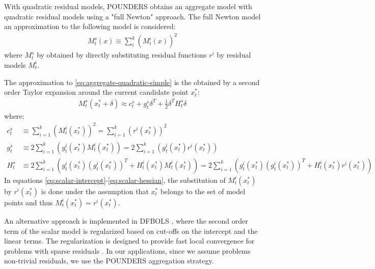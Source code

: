 With quadratic residual models, POUNDERS obtains an aggregate model with quadratic residual models using a "full Newton" approach. The full Newton model an approximation to the following model is considered:
\begin{align}
    M^s_t(x)\equiv\sum\limits_i^{k}(M^i_t(x))^2
    \label{eq:aggregate-quadratic-simple}
\end{align}
where $M^s_t$ by obtained by directly substituting residual functions $r^i$ by residual models $M_t^i$.

The approximation to \ref{eq:aggregate-quadratic-simple} is the obtained by a second order Taylor expansion around the current candidate point $x_t^*$:
\begin{align}
    M^s_t(x_t^*+\delta)\approx c_t^s+g^s_t\delta^T+\frac{1}{2}\delta^TH^s_t\delta
    \label{eq:taylor-exp}
\end{align}
where:
\begin{align}
    c_t^s &\equiv\sum\limits_{i=1}^k(M_t^i(x_t^*))^2 = \sum\limits_{i=1}^k(r^i(x_t^*))^2\label{eq:scalar-intercept}\\
     g^s_t&\equiv2\sum\limits_{i=1}^k(g_t^i(x_t^*)M_t^i(x_t^*))=2\sum\limits_{i=1}^k(g_t^i(x_t^*)r^i(x_t^*))\label{eq:scalar-gradient}\\
     H_t^s&\equiv2\sum\limits_{i=1}^k(g_t^i(x_t^*)(g_t^i(x_t^*))^T+H_t^i(x_t^*)M_t^i(x_t^*))=2\sum\limits_{i=1}^k(g_t^i(x_t^*)(g_t^i(x_t^*))^T+H_t^i(x_t^*)r^i(x_t^*))\label{eq:scalar-hessian}
\end{align}
In equations \ref{eq:scalar-intercept}-\ref{eq:scalar-hessian}, the substitution of $M_t^i(x_t^*)$ by $r^i(x_t^*)$ is done under the assumption that $x_t^*$ belongs to the set of model points and thus $M_t^i(x_t^*)=r^i(x_t^*)$.

An alternative approach is implemented in DFBOLS \citep{Zhang2010}, where the second order term of the scalar model is regularized based on cut-offs on the intercept and the linear terms. The regularization is designed to provide fast local convergence for problems with sparse residuals \citep{Zhang2010}. In our applications, since we assume problems non-trivial residuals, we use the POUNDERS aggregation strategy.
